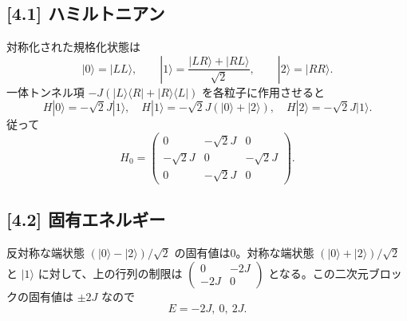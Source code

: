 \documentclass[11pt,a4paper]{article}
\begin{document}
\subsection*{[4.1] ハミルトニアン}
対称化された規格化状態は
\begin{equation}
 |0\rangle=|LL\rangle,\qquad
 |1\rangle=\frac{|LR\rangle+|RL\rangle}{\sqrt2},\qquad
 |2\rangle=|RR\rangle.
\end{equation}
一体トンネル項 $-J(|L\rangle\langle R|+|R\rangle\langle L|)$ を各粒子に作用させると
\begin{equation}
 H|0\rangle=-\sqrt2J|1\rangle,\quad
 H|1\rangle=-\sqrt2J(|0\rangle+|2\rangle),\quad
 H|2\rangle=-\sqrt2J|1\rangle.
\end{equation}
従って
\begin{equation}
 \boxed{H_0=\begin{pmatrix}
 0&-\sqrt2J&0\\-\sqrt2J&0&-\sqrt2J\\0&-\sqrt2J&0
 \end{pmatrix}.}
\end{equation}
\subsection*{[4.2] 固有エネルギー}
反対称な端状態 $(|0\rangle-|2\rangle)/\sqrt2$ の固有値は0。対称な端状態 $(|0\rangle+|2\rangle)/\sqrt2$ と $|1\rangle$ に対して、上の行列の制限は $\left(\begin{smallmatrix}0&-2J\\-2J&0\end{smallmatrix}\right)$ となる。この二次元ブロックの固有値は $\pm2J$ なので
\begin{equation}
 \boxed{E=-2J,\ 0,\ 2J.}
\end{equation}
\end{document}

